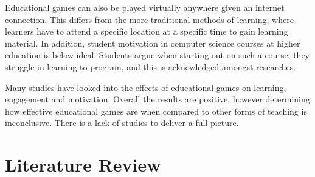 \documentclass[a4paper,11.5pt]{report}
\numberwithin{figure}{section}
\numberwithin{table}{section}
\numberwithin{equation}{section}
\numberwithin{equation}{section}
\newcommand\blankpage{%
    \null
    \thispagestyle{empty}%
    \addtocounter{page}{-1}%
    \newpage}
\begin{document}
Educational games can also be played virtually anywhere given an internet connection. This differs from the more traditional methods of learning, where learners have to attend a specific location at a specific time to gain learning material. In addition, student motivation in computer science courses at higher education is below ideal. Students argue when starting out on such a course, they struggle in learning to program, and this is acknowledged amongst researches.

Many studies have looked into the effects of educational games on learning, engagement and motivation. Overall the results are positive, however determining how effective educational games are when compared to other forms of teaching is inconclusive. There is a lack of studies to deliver a full picture.










\afterpage{\blankpage}

\chapter{Literature Review}




\end{document}
